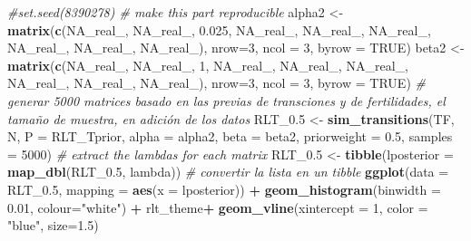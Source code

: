 \documentclass[
]{book}
\newenvironment{Shaded}{\begin{snugshade}}{\end{snugshade}}
\newcommand{\AttributeTok}[1]{\textcolor[rgb]{0.13,0.29,0.53}{#1}}
\newcommand{\CommentTok}[1]{\textcolor[rgb]{0.56,0.35,0.01}{\textit{#1}}}
\newcommand{\ConstantTok}[1]{\textcolor[rgb]{0.56,0.35,0.01}{#1}}
\newcommand{\DecValTok}[1]{\textcolor[rgb]{0.00,0.00,0.81}{#1}}
\newcommand{\FloatTok}[1]{\textcolor[rgb]{0.00,0.00,0.81}{#1}}
\newcommand{\FunctionTok}[1]{\textcolor[rgb]{0.13,0.29,0.53}{\textbf{#1}}}
\newcommand{\NormalTok}[1]{#1}
\newcommand{\OtherTok}[1]{\textcolor[rgb]{0.56,0.35,0.01}{#1}}
\newcommand{\SpecialCharTok}[1]{\textcolor[rgb]{0.81,0.36,0.00}{\textbf{#1}}}
\newcommand{\StringTok}[1]{\textcolor[rgb]{0.31,0.60,0.02}{#1}}
\theoremstyle{definition}
\theoremstyle{definition}
\theoremstyle{definition}
\theoremstyle{definition}
\theoremstyle{remark}
\begin{document}
\begin{Shaded}
\begin{Highlighting}[]
\CommentTok{\#set.seed(8390278) \# make this part reproducible}
\NormalTok{alpha2 }\OtherTok{\textless{}{-}} \FunctionTok{matrix}\NormalTok{(}\FunctionTok{c}\NormalTok{(}\ConstantTok{NA\_real\_}\NormalTok{, }\ConstantTok{NA\_real\_}\NormalTok{, }\FloatTok{0.025}\NormalTok{,}
                  \ConstantTok{NA\_real\_}\NormalTok{, }\ConstantTok{NA\_real\_}\NormalTok{, }\ConstantTok{NA\_real\_}\NormalTok{,}
                  \ConstantTok{NA\_real\_}\NormalTok{, }\ConstantTok{NA\_real\_}\NormalTok{, }\ConstantTok{NA\_real\_}\NormalTok{), }\AttributeTok{nrow=}\DecValTok{3}\NormalTok{, }\AttributeTok{ncol =} \DecValTok{3}\NormalTok{, }\AttributeTok{byrow =} \ConstantTok{TRUE}\NormalTok{)}
\NormalTok{beta2 }\OtherTok{\textless{}{-}} \FunctionTok{matrix}\NormalTok{(}\FunctionTok{c}\NormalTok{(}\ConstantTok{NA\_real\_}\NormalTok{, }\ConstantTok{NA\_real\_}\NormalTok{, }\DecValTok{1}\NormalTok{,}
                  \ConstantTok{NA\_real\_}\NormalTok{, }\ConstantTok{NA\_real\_}\NormalTok{, }\ConstantTok{NA\_real\_}\NormalTok{,}
                  \ConstantTok{NA\_real\_}\NormalTok{, }\ConstantTok{NA\_real\_}\NormalTok{, }\ConstantTok{NA\_real\_}\NormalTok{), }\AttributeTok{nrow=}\DecValTok{3}\NormalTok{, }\AttributeTok{ncol =} \DecValTok{3}\NormalTok{, }\AttributeTok{byrow =} \ConstantTok{TRUE}\NormalTok{)}
\CommentTok{\# generar 5000 matrices basado en las previas de transciones y de fertilidades, el tamaño de muestra, en adición de los datos}
\NormalTok{RLT\_0}\FloatTok{.5} \OtherTok{\textless{}{-}} \FunctionTok{sim\_transitions}\NormalTok{(TF, N, }\AttributeTok{P =}\NormalTok{ RLT\_Tprior, }\AttributeTok{alpha =}\NormalTok{ alpha2, }\AttributeTok{beta =}\NormalTok{ beta2,}
                \AttributeTok{priorweight =} \FloatTok{0.5}\NormalTok{, }\AttributeTok{samples =} \DecValTok{5000}\NormalTok{)}
\CommentTok{\# extract the lambdas for each matrix}
\NormalTok{RLT\_0}\FloatTok{.5} \OtherTok{\textless{}{-}} \FunctionTok{tibble}\NormalTok{(}\AttributeTok{lposterior =} \FunctionTok{map\_dbl}\NormalTok{(RLT\_0}\FloatTok{.5}\NormalTok{, lambda)) }\CommentTok{\# convertir la lista en un tibble}
\FunctionTok{ggplot}\NormalTok{(}\AttributeTok{data =}\NormalTok{ RLT\_0}\FloatTok{.5}\NormalTok{,}
       \AttributeTok{mapping =} \FunctionTok{aes}\NormalTok{(}\AttributeTok{x =}\NormalTok{ lposterior)) }\SpecialCharTok{+} 
  \FunctionTok{geom\_histogram}\NormalTok{(}\AttributeTok{binwidth =} \FloatTok{0.01}\NormalTok{, }\AttributeTok{colour=}\StringTok{"white"}\NormalTok{) }\SpecialCharTok{+} 
\NormalTok{  rlt\_theme}\SpecialCharTok{+} \FunctionTok{geom\_vline}\NormalTok{(}\AttributeTok{xintercept =} \DecValTok{1}\NormalTok{, }
                \AttributeTok{color =} \StringTok{"blue"}\NormalTok{, }\AttributeTok{size=}\FloatTok{1.5}\NormalTok{)}
\end{Highlighting}
\end{Shaded}
\end{document}

